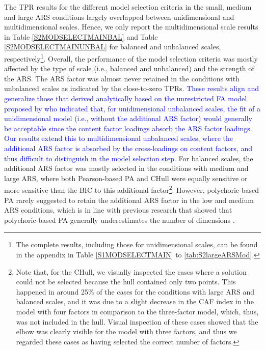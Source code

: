 \documentclass[a4paper,man,natbib]{apa6}
\begin{document}
\begin{linenumbers}
The TPR results for the different model selection criteria in the small, medium and large ARS conditions largely overlapped between unidimensional and multidimensional scales. Hence, we only report the multidimensional scale results in Table \ref{S2MODSELECTMAINBAL} and Table \ref{S2MODSELECTMAINUNBAL} for balanced and unbalanced scales, respectively\footnote{The complete results, including those for unidimensional scales,  can be found in the appendix in Table \ref{S1MODSELECTMAIN} to \ref{tab:S2largeARSMod}.}. Overall, the performance of the model selection criteria was mostly affected by the type of scale (i.e., balanced and unbalanced) and the strength of the ARS. The ARS factor was almost never retained in the conditions with unbalanced scales as indicated by the close-to-zero TPRs. \label{refpage:R2Mj2a}\textcolor{blue}{These results align and generalize those that \citet{ferrando2010acquiescence} derived analytically based on the unrestricted FA model proposed by \citep{ferrando2003unrestricted} who indicated that, for unidimensional unbalanced scales, the fit of a unidimensional model (i.e., without the additional ARS factor) would generally be acceptable since the content factor loadings absorb the ARS factor loadings. Our results extend this to multidimensional unbalanced scales, where the additional ARS factor is absorbed by the cross-loadings on content factors, and thus difficult to distinguish in the model selection step.} For balanced scales, the additional ARS factor was mostly selected in the conditions with medium and large ARS, where both Pearson-based PA and CHull were equally sensitive or more sensitive than the BIC to this additional factor\footnote{Note that, for the CHull, we visually inspected the cases where a solution could not be selected because the hull contained only two points. This happened in around 25\% of the cases for the conditions with large ARS and balanced scales, and it was due to a slight decrease in the CAF index in the model with four factors in comparison to the three-factor model, which, thus, was not included in the hull. Visual inspection of these cases showed that the elbow was clearly visible for the model with three factors, and thus we regarded these cases as having selected the correct number of factors.}. %
However, polychoric-based PA rarely suggested to retain the additional ARS factor in the low and medium ARS conditions, which is in line with previous research that showed that polychoric-based PA generally underestimates the number of dimensions \citep{cho2009accuracy}.  %

\end{linenumbers}
\end{document}
